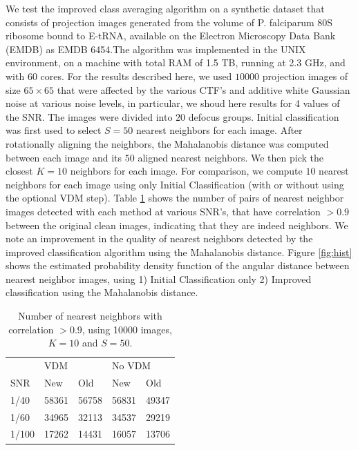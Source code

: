 \documentclass{article}
\begin{document}
We test the improved class averaging algorithm on a synthetic dataset that consists of projection images generated from the volume of P. falciparum 80S ribosome bound to E-tRNA, available on the Electron Microscopy Data Bank (EMDB) as EMDB 6454.The algorithm was implemented in the UNIX environment, on a machine with total RAM of 1.5 TB, running at 2.3 GHz, and with 60 cores. 
For the results described here, we used $10000$ projection images of size $65 \times 65$ that were affected by the various CTF's and additive white Gaussian noise at various noise levels, in particular, we shoud here results for 4 values of the SNR. The images were divided into $20$ defocus groups. Initial classification was first used to select $S=50$ nearest neighbors for each image. After rotationally aligning the neighbors, the Mahalanobis distance was computed between each image and its $50$ aligned nearest neighbors. We then pick the closest $K=10$ neighbors for each image. For comparison, we compute $10$ nearest neighbors for each image using only Initial Classification (with or without using the optional VDM step). Table \ref{table:1} shows the number of pairs of nearest neighbor images detected with each method at various SNR's, that have correlation $>0.9$ between the original clean images, indicating that they are indeed neighbors. We note an improvement in the quality of nearest neighbors detected by the improved classification algorithm using the Mahalanobis distance. Figure \ref{fig:hist} shows the estimated probability density function of the angular distance between nearest neighbor images, using 1) Initial Classification only 2) Improved classification using the Mahalanobis distance. 

\begin{table}[]
\centering
\caption{Number of nearest neighbors with correlation $>0.9$, 
using 10000 images, $K=10$ and $S=50$.
}
\label{table:1}
\begin{tabular}{lllll}
      & \multicolumn{2}{l}{VDM} & \multicolumn{2}{l}{No VDM} \\ \cline{2-5} 
SNR   & New        & Old        & New          & Old         \\ \cline{2-5} 
1/40 & 58361          & 56758          & 56831            & 49347       \\
1/60  & 34965          & 32113          & 34537            & 29219       \\
1/100 & 17262      & 14431      & 16057        & 13706        \\ \cline{2-5} 
\end{tabular}
\end{table}
\end{document}
